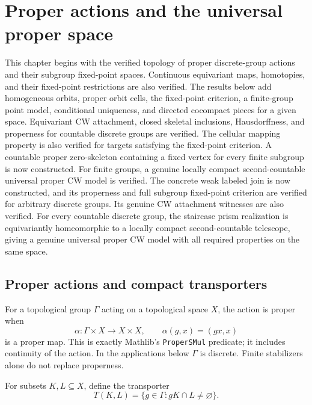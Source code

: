\chapter{Proper actions and the universal proper space}
\label{ch:proper-actions}

This chapter begins with the verified topology of proper discrete-group
actions and their subgroup fixed-point spaces. Continuous equivariant maps,
homotopies, and their fixed-point restrictions are also verified. The results below
add homogeneous orbits, proper orbit cells, the fixed-point criterion, a finite-group
point model, conditional uniqueness, and directed cocompact pieces for a given space.
Equivariant CW attachment, closed skeletal inclusions, Hausdorffness, and
properness for countable discrete groups are verified. The cellular mapping
property is also verified for targets satisfying the fixed-point criterion.
A countable proper zero-skeleton containing a fixed vertex for every finite
subgroup is now constructed. For finite groups, a genuine locally compact
second-countable universal proper CW model is verified. The concrete weak
labeled join is now constructed, and its properness and full subgroup
fixed-point criterion are verified for arbitrary discrete groups. Its genuine
CW attachment witnesses are also verified. For every countable discrete
group, the staircase prism realization is equivariantly homeomorphic to
a locally compact second-countable telescope, giving a genuine universal
proper CW model with all required properties on the same space.

\section{Proper actions and compact transporters}

\begin{definition}\label{def:proper-action}
\leanok
For a topological group $\Gamma$ acting on a topological space $X$, the
action is proper when
\[
 \alpha:\Gamma\times X\longrightarrow X\times X,
 \qquad \alpha(g,x)=(gx,x)
\]
is a proper map. This is exactly Mathlib's \texttt{ProperSMul} predicate;
it includes continuity of the action. In the applications below $\Gamma$
is discrete. Finite stabilizers alone do not replace properness.
\end{definition}

\begin{definition}\label{def:compact-transporter}
\leanok
For subsets $K,L\subseteq X$, define the transporter
\[
 T(K,L)=\{g\in\Gamma:gK\cap L\ne\varnothing\}.
\]
\end{definition}

